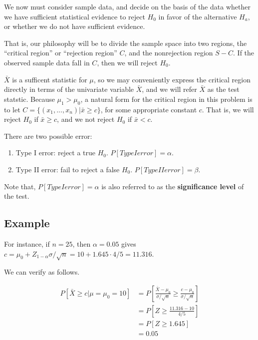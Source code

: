 \documentclass[]{book}
\begin{document}
We now must consider sample data, and decide on the basis of the data whether we have sufficient statistical evidence to reject \(H_0\) in favor of the alternative \(H_a\), or whether we do not have sufficient evidence.

That is, our philosophy will be to divide the sample space into two regions, the ``critical region'' or ``rejection region'' \(C\), and the nonrejection region \(S-C\). If the observed sample data fall in \(C\), then we will reject \(H_0\).

\(\bar{X}\) is a sufficent statistic for \(\mu\), so we may conveniently express the critical region directly in terms of the univariate variable \(\bar{X}\), and we will refer \(\bar{X}\) as the test statstic. Because \(\mu_1 > \mu_0\), a natural form for the critical region in this problem is to let \(C=\{ (x_1,..., x_n) | \bar{x} \geq c\}\), for some appropriate constant \(c\). That is, we will reject \(H_0\) if \(\bar{x} \geq c\), and we not reject \(H_0\) if \(\bar{x} < c\).

There are two possible error:

\begin{enumerate}
\def\labelenumi{\arabic{enumi}.}
\item
  Type I error: reject a true \(H_0\). \(P[Type I error]=\alpha\).
\item
  Type II error: fail to reject a false \(H_0\). \(P[Type II error]=\beta\).
\end{enumerate}

Note that, \(P[Type I error]=\alpha\) is also referred to as the \textbf{significance level} of the test.

\hypertarget{example}{%
\subsection{Example}\label{example}}

For instance, if \(n=25\), then \(\alpha=0.05\) gives \(c=\mu_0+Z_{1-\alpha}\sigma/\sqrt{n}=10+1.645 \cdot 4/5=11.316\).

We can verify as follows.

\[\begin{aligned} P[\bar{X}\geq c | \mu=\mu_0=10] &=P[\frac{\bar{X}-\mu_0}{\sigma/\sqrt{n}} \geq \frac{c-\mu_0}{\sigma/\sqrt{n}}] \\ &=P[Z \geq \frac{11.316-10}{4/5}] \\&=P[Z\geq 1.645] \\&=0.05 \end{aligned}\]
\end{document}
